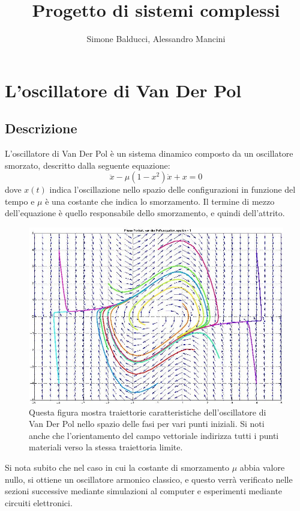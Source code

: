 \documentclass[12pt]{article}
\title{Progetto di sistemi complessi}
\author{Simone Balducci, Alessandro Mancini}
\date{}
\begin{document}
\maketitle 
\section{L'oscillatore di Van Der Pol}
\subsection{Descrizione}
L'oscillatore di Van Der Pol è un sistema dinamico composto da un oscillatore smorzato, descritto dalla seguente equazione:
\begin{equation}
	\ddot{x} - \mu(1-x^2)\dot{x} + x = 0
\end{equation}
dove $x(t)$ indica l'oscillazione nello spazio delle configurazioni in funzione del tempo e $\mu$ è una costante che indica lo smorzamento. Il termine di mezzo dell'equazione è quello responsabile dello smorzamento, e quindi dell'attrito. 
\begin{figure}[h]
	\centering
	\includegraphics[scale=.4]{Spazio delle fasi oscillatore} 
	\caption{Questa figura mostra traiettorie caratteristiche dell'oscillatore di Van Der Pol nello spazio delle fasi per vari punti iniziali. Si noti anche che l'orientamento del campo vettoriale indirizza tutti i punti materiali verso la stessa traiettoria limite.}
\end{figure}
Si nota subito che nel caso in cui la costante di smorzamento $\mu$ abbia valore nullo, si ottiene un oscillatore armonico classico, e questo verrà verificato nelle sezioni successive mediante simulazioni al computer e esperimenti mediante circuiti elettronici. 
\end{document}
